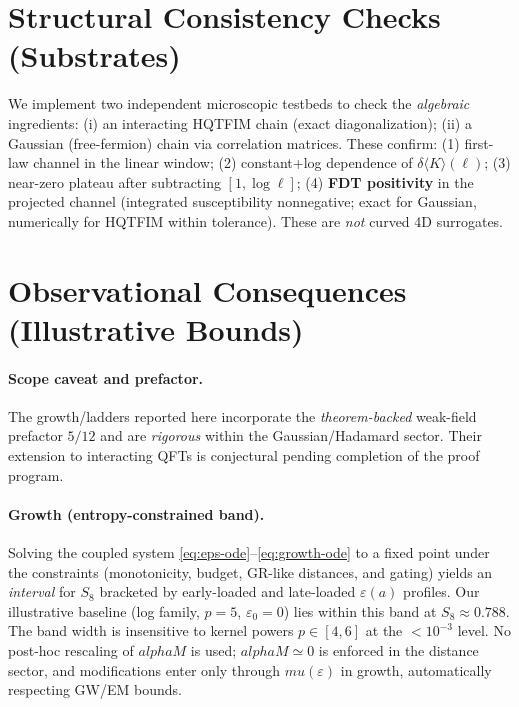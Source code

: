 \documentclass[aps,prd,onecolumn,superscriptaddress,nofootinbib]{revtex4-2}
\def\mu{mu}%
\def\alpha{alpha}%
\def\alpha_M{alphaM}%
\begin{document}
\begin{center}
\end{center}

\section{Structural Consistency Checks (Substrates)}
\label{sec:substrates}
We implement two independent microscopic testbeds to check the \emph{algebraic} ingredients: (i) an interacting HQTFIM chain (exact diagonalization); (ii) a Gaussian (free-fermion) chain via correlation matrices. These confirm: (1) first-law channel in the linear window; (2) constant+log dependence of $\delta\langle K\rangle(\ell)$; (3) near-zero plateau after subtracting $[1,\log \ell]$; (4) \textbf{FDT positivity} in the projected channel (integrated susceptibility nonnegative; exact for Gaussian, numerically for HQTFIM within tolerance). These are \emph{not} curved 4D surrogates.

\section{Observational Consequences (Illustrative Bounds)}
\label{sec:obs}
\paragraph{Scope caveat and prefactor.} The growth/ladders reported here incorporate the \emph{theorem-backed} weak-field prefactor $5/12$ and are \emph{rigorous} within the Gaussian/Hadamard sector. Their extension to interacting QFTs is conjectural pending completion of the proof program.

\paragraph{Growth (entropy-constrained band).}
Solving the coupled system \eqref{eq:eps-ode}–\eqref{eq:growth-ode} to a fixed point under the constraints (monotonicity, budget, GR-like distances, and gating) yields an \emph{interval} for $S_8$ bracketed by early-loaded and late-loaded $\varepsilon(a)$ profiles. Our illustrative baseline (log family, $p=5$, $\varepsilon_0=0$) lies within this band at $S_8\approx 0.788$. The band width is insensitive to kernel powers $p\in[4,6]$ at the $<10^{-3}$ level. No post-hoc rescaling of $\alpha_M$ is used; $\alpha_M\simeq 0$ is enforced in the distance sector, and modifications enter only through $\mu(\varepsilon)$ in growth, automatically respecting GW/EM bounds.
\end{document}

